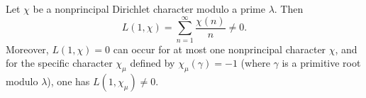 Let $\chi$ be a nonprincipal Dirichlet character modulo a prime $\lambda$. Then
$$L(1, \chi) = \sum_{n=1}^{\infty} \frac{\chi(n)}{n} \neq 0.$$
Moreover, $L(1, \chi) = 0$ can occur for at most one nonprincipal character $\chi$, and for the specific character $\chi_{\mu}$ defined by $\chi_{\mu}(\gamma) = -1$ (where $\gamma$ is a primitive root modulo $\lambda$), one has $L(1, \chi_{\mu}) \neq 0$.
